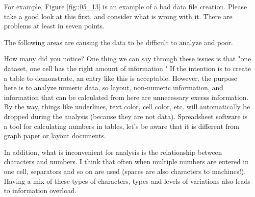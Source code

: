 \documentclass{ltjsbook}
\begin{document}
For example, Figure \ref{fig::05_13} is an example of a bad data file creation. Please take a good look at this first, and consider what is wrong with it. There are problems at least in seven points.


The following areas are causing the data to be difficult to analyze and poor.

How many did you notice? One thing we can say through these issues is that "one dataset, one cell has the right amount of information." If the intention is to create a table to demonstrate, an entry like this is acceptable. However, the purpose here is to analyze numeric data, so layout, non-numeric information, and information that can be calculated from here are unnecessary excess information. By the way, things like underlines, text color, cell color, etc. will automatically be dropped during the analysis (because they are not data). Spreadsheet software is a tool for calculating numbers in tables, let's be aware that it is different from graph paper or layout documents.

In addition, what is inconvenient for analysis is the relationship between characters and numbers. I think that often when multiple numbers are entered in one cell, separators and so on are used (spaces are also characters to machines!). Having a mix of these types of characters, types and levels of variations also leads to information overload.
\end{document}
